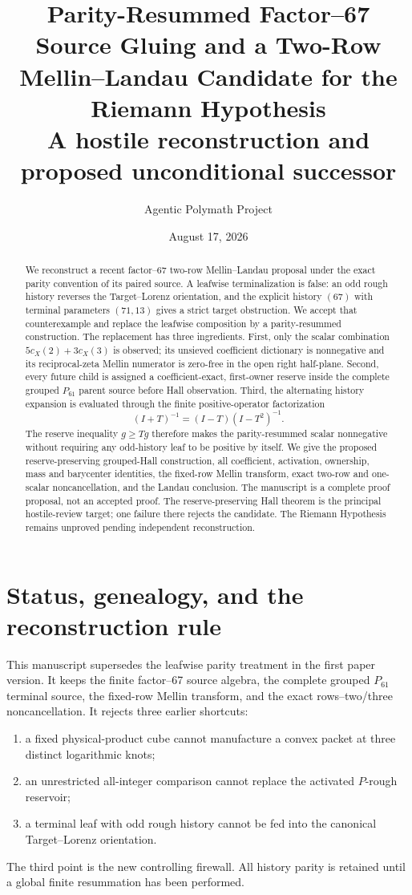 \documentclass[11pt]{article}
\title{Parity-Resummed Factor--67 Source Gluing and a Two-Row Mellin--Landau Candidate for the Riemann Hypothesis\\\large A hostile reconstruction and proposed unconditional successor}
\author{Agentic Polymath Project}
\date{August 17, 2026}
\newcommand{\1}{\mathbf 1}
\begin{document}
\maketitle

\begin{abstract}
We reconstruct a recent factor--67 two-row Mellin--Landau proposal under the exact parity convention of its paired source.  A leafwise terminalization is false: an odd rough history reverses the Target--Lorenz orientation, and the explicit history $(67)$ with terminal parameters $(71,13)$ gives a strict target obstruction.  We accept that counterexample and replace the leafwise composition by a parity-resummed construction.  The replacement has three ingredients.  First, only the scalar combination $5c_X(2)+3c_X(3)$ is observed; its unsieved coefficient dictionary is nonnegative and its reciprocal-zeta Mellin numerator is zero-free in the open right half-plane.  Second, every future child is assigned a coefficient-exact, first-owner reserve inside the complete grouped $P_{61}$ parent source before Hall observation.  Third, the alternating history expansion is evaluated through the finite positive-operator factorization
\[
 (I+T)^{-1}=(I-T)(I-T^2)^{-1}.
\]
The reserve inequality $g\ge Tg$ therefore makes the parity-resummed scalar nonnegative without requiring any odd-history leaf to be positive by itself.  We give the proposed reserve-preserving grouped-Hall construction, all coefficient, activation, ownership, mass and barycenter identities, the fixed-row Mellin transform, exact two-row and one-scalar noncancellation, and the Landau conclusion.  The manuscript is a complete proof proposal, not an accepted proof.  The reserve-preserving Hall theorem is the principal hostile-review target; one failure there rejects the candidate.  The Riemann Hypothesis remains unproved pending independent reconstruction.
\end{abstract}

\tableofcontents

\section{Status, genealogy, and the reconstruction rule}

This manuscript supersedes the leafwise parity treatment in the first paper version.  It keeps the finite factor--67 source algebra, the complete grouped $P_{61}$ terminal source, the fixed-row Mellin transform, and the exact rows--two/three noncancellation.  It rejects three earlier shortcuts:
\begin{enumerate}[label=(F\arabic*)]
\item a fixed physical-product cube cannot manufacture a convex packet at three distinct logarithmic knots;
\item an unrestricted all-integer comparison cannot replace the activated $P$-rough reservoir;
\item a terminal leaf with odd rough history cannot be fed into the canonical Target--Lorenz orientation.
\end{enumerate}
The third point is the new controlling firewall.  All history parity is retained until a global finite resummation has been performed.
\end{document}
